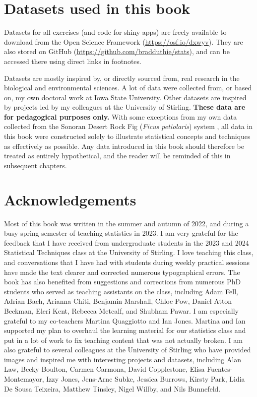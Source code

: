 \documentclass[
  openany]{krantz}
\begin{document}
\hypertarget{datasets}{%
\section*{Datasets used in this book}\label{datasets}}


Datasets for all exercises (and code for shiny apps) are freely available to download from the Open Science Framework (\url{https://osf.io/dxwyv}).
They are also stored on GitHub (\url{https://github.com/bradduthie/stats}), and can be accessed there using direct links in footnotes.

Datasets are mostly inspired by, or directly sourced from, real research in the biological and environmental sciences.
A lot of data were collected from, or based on, my own doctoral work at Iowa State University.
Other datasets are inspired by projects led by my colleagues at the University of Stirling.
\textbf{These data are for pedagogical purposes only.}
With some exceptions from my own data collected from the Sonoran Desert Rock Fig (\emph{Ficus petiolaris}) system \citep[see][]{Duthie2015b, Duthie2016}, all data in this book were constructed solely to illustrate statistical concepts and techniques as effectively as possible.
Any data introduced in this book should therefore be treated as entirely hypothetical, and the reader will be reminded of this in subsequent chapters.

\hypertarget{acknowledgements}{%
\section*{Acknowledgements}\label{acknowledgements}}


Most of this book was written in the summer and autumn of 2022, and during a busy spring semester of teaching statistics in 2023.
I am very grateful for the feedback that I have received from undergraduate students in the 2023 and 2024 Statistical Techniques class at the University of Stirling.
I love teaching this class, and conversations that I have had with students during weekly practical sessions have made the text clearer and corrected numerous typographical errors.
The book has also benefited from suggestions and corrections from numerous PhD students who served as teaching assistants on the class, including Adam Fell, Adrian Bach, Arianna Chiti, Benjamin Marshall, Chloe Pow, Daniel Atton Beckman, Eleri Kent, Rebecca Metcalf, and Shubham Pawar.
I am especially grateful to my co-teachers Martina Quaggiotto and Ian Jones.
Martina and Ian supported my plan to overhaul the learning material for our statistics class and put in a lot of work to fix teaching content that was not actually broken.
I am also grateful to several colleagues at the University of Stirling who have provided images and inspired me with interesting projects and datasets, including Alan Law, Becky Boulton, Carmen Carmona, David Copplestone, Elisa Fuentes-Montemayor, Izzy Jones, Jens-Arne Subke, Jessica Burrows, Kirsty Park, Lidia De Sousa Teixeira, Matthew Tinsley, Nigel Willby, and Nils Bunnefeld.
\end{document}
